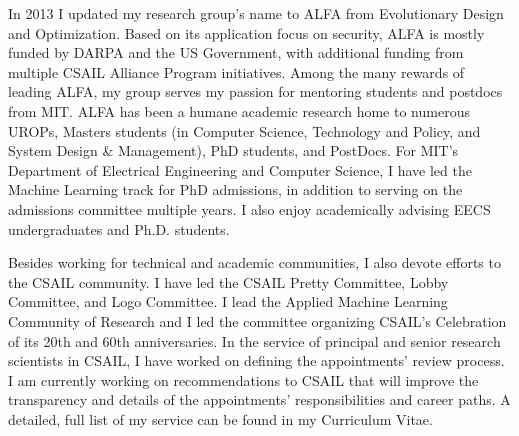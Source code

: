 \documentclass[12pt,bibliography=numbered]{article}
\begin{document}
In 2013 I updated my research group’s name to ALFA from Evolutionary Design and Optimization. Based on its application focus on security, ALFA is mostly funded by DARPA and the US Government, with additional funding from multiple CSAIL Alliance Program initiatives.  %
Among the many rewards of leading ALFA, my group serves my passion for mentoring students and postdocs from MIT. ALFA has been a humane academic research home to numerous UROPs, Masters students (in Computer Science, Technology and Policy, and System Design \& Management), PhD students, and PostDocs. For MIT's Department of Electrical Engineering and Computer Science, I have led the Machine Learning track for PhD admissions, in addition to serving on the admissions committee multiple years.  I also enjoy academically advising EECS undergraduates and Ph.D. students.   

Besides working for technical and academic communities, I also devote efforts to the CSAIL community. I have led the CSAIL Pretty Committee, Lobby Committee, and Logo Committee. I lead the Applied Machine Learning Community of Research and I led the committee organizing CSAIL's Celebration of its  20th and 60th anniversaries.  In the service of principal and senior research scientists in CSAIL, I have worked on defining the appointments' review process. I am currently working on recommendations to CSAIL that will improve the transparency and details of the appointments' responsibilities and career paths.  A detailed, full list of my service can be found in my Curriculum Vitae.  


%


\end{document}
